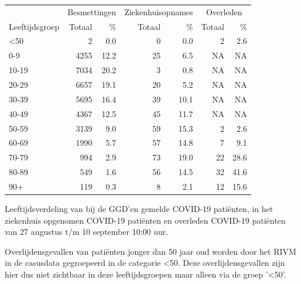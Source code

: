 \documentclass[
  english,
  man,floatsintext]{apa6}
\begin{document}
\begin{table}
\centering\begingroup\fontsize{11}{13}\selectfont

\begin{threeparttable}
\begin{tabular}{lrrrrrr}
\toprule
\multicolumn{1}{c}{ } & \multicolumn{2}{c}{Besmettingen} & \multicolumn{2}{c}{Ziekenhuisopnames} & \multicolumn{2}{c}{Overleden} \\
\cmidrule(l{3pt}r{3pt}){2-3} \cmidrule(l{3pt}r{3pt}){4-5} \cmidrule(l{3pt}r{3pt}){6-7}
Leeftijdsgroep & Totaal & \% & Totaal & \% & Totaal & \%\\
\midrule
<50 & 2 & 0.0 & 0 & 0.0 & 2 & 2.6\\
0-9 & 4255 & 12.2 & 25 & 6.5 & NA & NA\\
10-19 & 7034 & 20.2 & 3 & 0.8 & NA & NA\\
20-29 & 6657 & 19.1 & 20 & 5.2 & NA & NA\\
30-39 & 5695 & 16.4 & 39 & 10.1 & NA & NA\\
40-49 & 4367 & 12.5 & 45 & 11.7 & NA & NA\\
50-59 & 3139 & 9.0 & 59 & 15.3 & 2 & 2.6\\
60-69 & 1990 & 5.7 & 57 & 14.8 & 7 & 9.1\\
70-79 & 994 & 2.9 & 73 & 19.0 & 22 & 28.6\\
80-89 & 549 & 1.6 & 56 & 14.5 & 32 & 41.6\\
90+ & 119 & 0.3 & 8 & 2.1 & 12 & 15.6\\
\bottomrule
\end{tabular}
\begin{tablenotes}
\item[1] Leeftijdsverdeling van bij de GGD’en gemelde COVID-19 patiënten, in het ziekenhuis opgenomen COVID-19 patiënten en overleden COVID-19 patiënten van 27 augustus t/m 10 september 10:00 uur.
\item[2] Overlijdensgevallen van patiënten jonger dan 50 jaar oud worden door het RIVM in de casusdata gegroepeerd in de categorie <50. Deze overlijdensgevallen zijn hier dus niet zichtbaar in deze leeftijdsgroepen maar alleen via de groep '<50'.
\end{tablenotes}
\end{threeparttable}
\endgroup{}
\end{table}

\newpage
\end{document}
